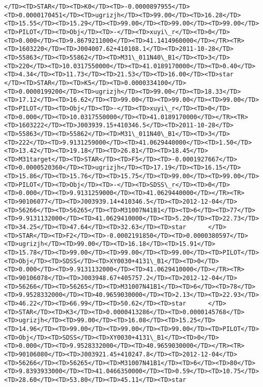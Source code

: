 \documentclass[11pt]{article}
\begin{document}
\begin{Verbatim}[commandchars=\\\{\}]
</TD><TD>STAR</TD><TD>K0</TD><TD>-0.0000897955</TD><TD>0.0000170451</TD><TD>ugrizjh</TD><TD>99.00</TD><TD>16.28</TD><TD>15.55</TD><TD>15.29</TD><TD>99.00</TD><TD>99.00</TD><TD>99.00</TD><TD>PILOT</TD><TD>Obj</TD><TD>-</TD><TD>xuyi\_r</TD><TD>0</TD><TD>0.000</TD><TD>9.8679211000</TD><TD>41.1414960000</TD></TR><TR><TD>1603220</TD><TD>J004007.62+410108.1</TD><TD>2011-10-28</TD><TD>55863</TD><TD>55862</TD><TD>M31\_011N40\_B1</TD><TD>3</TD><TD>220</TD><TD>10.0317550000</TD><TD>41.0189170000</TD><TD>0.40</TD><TD>4.34</TD><TD>11.73</TD><TD>21.53</TD><TD>16.00</TD><TD>star     </TD><TD>STAR</TD><TD>K5</TD><TD>0.0000334100</TD><TD>0.0000199200</TD><TD>ugrizjh</TD><TD>99.00</TD><TD>18.33</TD><TD>17.12</TD><TD>16.62</TD><TD>99.00</TD><TD>99.00</TD><TD>99.00</TD><TD>PILOT</TD><TD>Obj</TD><TD>-</TD><TD>xuyi\_r</TD><TD>0</TD><TD>0.000</TD><TD>10.0317550000</TD><TD>41.0189170000</TD></TR><TR><TD>1603222</TD><TD>J003939.15+410346.5</TD><TD>2011-10-28</TD><TD>55863</TD><TD>55862</TD><TD>M31\_011N40\_B1</TD><TD>3</TD><TD>222</TD><TD>9.9131259000</TD><TD>41.0629440000</TD><TD>1.50</TD><TD>13.42</TD><TD>19.18</TD><TD>26.81</TD><TD>18.45</TD><TD>M31target</TD><TD>STAR</TD><TD>F5</TD><TD>-0.0001927667</TD><TD>0.0000520360</TD><TD>ugrizjh</TD><TD>17.19</TD><TD>16.15</TD><TD>15.86</TD><TD>15.76</TD><TD>15.75</TD><TD>99.00</TD><TD>99.00</TD><TD>PILOT</TD><TD>Obj</TD><TD>-</TD><TD>SDSS\_r</TD><TD>0</TD><TD>0.000</TD><TD>9.9131259000</TD><TD>41.0629440000</TD></TR><TR><TD>90106077</TD><TD>J003939.14+410346.5</TD><TD>2012-12-04</TD><TD>56266</TD><TD>56265</TD><TD>M31007N41B1</TD><TD>6</TD><TD>77</TD><TD>9.9131132000</TD><TD>41.0629410000</TD><TD>5.20</TD><TD>22.73</TD><TD>34.25</TD><TD>47.64</TD><TD>32.63</TD><TD>star      </TD><TD>STAR</TD><TD>F2</TD><TD>-0.0002191850</TD><TD>0.0000380597</TD><TD>ugrizjh</TD><TD>99.00</TD><TD>16.18</TD><TD>15.91</TD><TD>15.78</TD><TD>99.00</TD><TD>99.00</TD><TD>99.00</TD><TD>PILOT</TD><TD>Obj</TD><TD>SDSS</TD><TD>XY0030+4131\_B1</TD><TD>0</TD><TD>0.000</TD><TD>9.9131132000</TD><TD>41.0629410000</TD></TR><TR><TD>90106078</TD><TD>J003948.67+405757.2</TD><TD>2012-12-04</TD><TD>56266</TD><TD>56265</TD><TD>M31007N41B1</TD><TD>6</TD><TD>78</TD><TD>9.9528332000</TD><TD>40.9659030000</TD><TD>2.13</TD><TD>22.93</TD><TD>46.22</TD><TD>66.99</TD><TD>50.62</TD><TD>star      </TD><TD>STAR</TD><TD>K3</TD><TD>0.0000413286</TD><TD>0.0000145768</TD><TD>ugrizjh</TD><TD>99.00</TD><TD>16.08</TD><TD>15.25</TD><TD>14.96</TD><TD>99.00</TD><TD>99.00</TD><TD>99.00</TD><TD>PILOT</TD><TD>Obj</TD><TD>SDSS</TD><TD>XY0030+4131\_B1</TD><TD>0</TD><TD>0.000</TD><TD>9.9528332000</TD><TD>40.9659030000</TD></TR><TR><TD>90106080</TD><TD>J003921.45+410247.8</TD><TD>2012-12-04</TD><TD>56266</TD><TD>56265</TD><TD>M31007N41B1</TD><TD>6</TD><TD>80</TD><TD>9.8393933000</TD><TD>41.0466350000</TD><TD>0.59</TD><TD>10.75</TD><TD>28.60</TD><TD>53.80</TD><TD>45.11</TD><TD>star      
\end{Verbatim}
\end{document}
